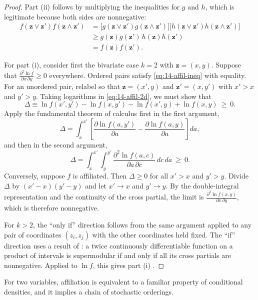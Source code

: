 \begin{proof}
Part (ii) follows by multiplying the inequalities for $g$ and $h$, which is legitimate because both sides
are nonnegative:
\begin{align*}
f(\bm z\vee\bm z')f(\bm z\wedge\bm z')
&=\bigl[g(\bm z\vee\bm z')g(\bm z\wedge\bm z')\bigr]\bigl[h(\bm z\vee\bm z')h(\bm z\wedge\bm z')\bigr]\\
&\ge g(\bm z)g(\bm z')\,h(\bm z)h(\bm z')\\
&=f(\bm z)f(\bm z').
\end{align*}

For part (i), consider first the bivariate case $k=2$ with $\bm z=(x,y)$. Suppose that
$\frac{\partial^2\ln f}{\partial x\,\partial y}\ge 0$ everywhere. Ordered pairs satisfy
\eqref{eq:14-affil-ineq} with equality. For an unordered pair, relabel so that $\bm z=(x',y)$ and
$\bm z'=(x,y')$ with $x'>x$ and $y'>y$. Taking logarithms in \eqref{eq:14-affil-2d}, we must show that
\[
\Delta\equiv\ln f(x',y')-\ln f(x,y')-\ln f(x',y)+\ln f(x,y)\ \ge\ 0.
\]
Apply the fundamental theorem of calculus first in the first argument,
\[
\Delta=\int_x^{x'}\left[\frac{\partial\ln f(a,y')}{\partial a}-\frac{\partial\ln f(a,y)}{\partial a}\right]da,
\]
and then in the second argument,
\[
\Delta=\int_x^{x'}\!\!\int_y^{y'}\frac{\partial^2\ln f(a,c)}{\partial a\,\partial c}\,dc\,da\ \ge\ 0.
\]
Conversely, suppose $f$ is affiliated. Then $\Delta\ge 0$ for all $x'>x$ and $y'>y$. Divide $\Delta$ by
$(x'-x)(y'-y)$ and let $x'\to x$ and $y'\to y$. By the double-integral representation and the continuity of
the cross partial, the limit is $\frac{\partial^2\ln f(x,y)}{\partial x\,\partial y}$, which is therefore
nonnegative.

For $k>2$, the ``only if'' direction follows from the same argument applied to any pair of coordinates
$(z_i,z_j)$ with the other coordinates held fixed. The ``if'' direction uses a result of
\citet[p.~310]{Topkis1978}: a twice continuously differentiable function on a product of intervals is
supermodular if and only if all its cross partials are nonnegative. Applied to $\ln f$, this gives part (i)
\citep[p.~1098]{MilgromWeber1982}.
\end{proof}

For two variables, affiliation is equivalent to a familiar property of conditional densities, and it
implies a chain of stochastic orderings.

